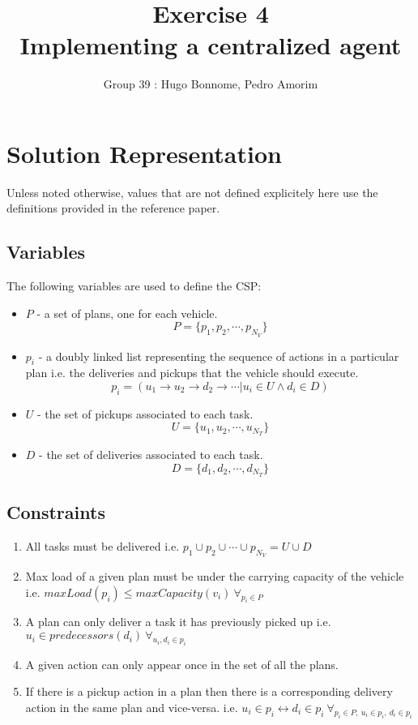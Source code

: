 \documentclass[11pt]{article}
\title{\bf Exercise 4\\ Implementing a centralized agent}
\author{Group 39 : Hugo Bonnome, Pedro Amorim}
\begin{document}
\maketitle

\section{Solution Representation}
Unless noted otherwise, values that are not defined explicitely here use the
definitions provided in the reference paper. 

\subsection{Variables}
The following variables are used to define the CSP:
\begin{itemize}
\item $P$ - a set of plans, one for each vehicle.
  $$P = \{p_1, p_2,\cdots, p_{N_V}\}$$
\item $p_i$ - a doubly linked list representing the sequence of actions in a
  particular plan i.e. the deliveries and pickups that the vehicle should
  execute.
  $$p_i = (u_1 \rightarrow u_2 \rightarrow d_2 \rightarrow \cdots | u_i \in U
  \wedge d_i \in D)$$
\item $U$ - the set of pickups associated to each task.
  $$U = \{u_1, u_2, \cdots, u_{N_T}\}$$
\item $D$ - the set of deliveries associated to each task.
  $$D = \{d_1, d_2, \cdots, d_{N_T}\}$$
\end{itemize}

\subsection{Constraints}
\begin{enumerate}
\item All tasks must be delivered i.e. $p_1 \cup p_2 \cup \cdots \cup p_{N_V} = U
  \cup D$ 
\item Max load of a given plan must be under the carrying capacity of the
  vehicle i.e. $maxLoad(p_i) \leq maxCapacity(v_i)\  \forall_{p_i \in P}$
\item A plan can only deliver a task it has previously picked up i.e. $u_i \in
  predecessors(d_i)\ \forall_{u_i, d_i \in p_i}$
\item A given action can only appear once in the set of all the plans.
\item If there is a pickup action in a plan then there is a corresponding
delivery action in the same plan and vice-versa. i.e. $u_i \in p_i
\leftrightarrow d_i \in p_i \ \forall_{p_i \in P,\  u_i \in p_i,\  d_i \in p_i}$
\end{enumerate}
\end{document}
